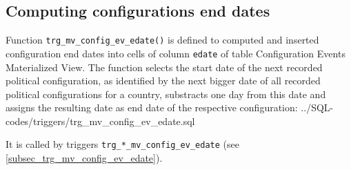 \subsection{Computing configurations end dates}\label{subsec_fun_trg_mv_config_ev_edate}

Function \texttt{trg\_mv\_config\_ev\_edate()} is defined to computed and inserted configuration end dates into cells of column \texttt{edate} of table Configuration Events Materialized View.
The function selects the start date of the next recorded political configuration, as identified by the next bigger date of all recorded political configurations for a country, substracts one day from this date and assigns the resulting date as end date of the respective configuration:
%
{../SQL-codes/triggers/trg_mv_config_ev_edate.sql}

It is called by triggers \texttt{trg\_*\_mv\_config\_ev\_edate} (see \ref{subsec_trg_mv_config_ev_edate}).
